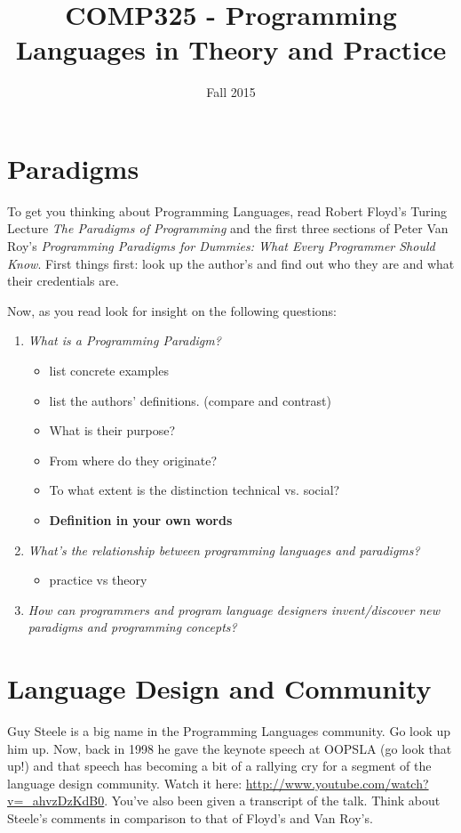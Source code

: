 \documentclass[10pt]{article}
\title{COMP325 - Programming Languages in Theory and Practice}
\author{  }
\date{Fall 2015}
\begin{document}
\maketitle

\section{Paradigms}

To get you thinking about Programming Languages, read Robert Floyd's Turing Lecture \textit{The Paradigms of Programming} and the first three sections of Peter Van Roy's \textit{Programming Paradigms for Dummies: What Every Programmer Should Know}.  First things first: look up the author's and find out who they are and what their credentials are.  

Now, as you read look for insight on the following questions:
\begin{enumerate}
\item \textit{What is a Programming Paradigm?}
\begin{itemize}
\item list concrete examples
\item list the authors' definitions. (compare and contrast)
\item What is their purpose? 
\item From where do they originate? 
\item To what extent is the distinction technical vs. social?
\item \textbf{Definition in your own words}
\end{itemize}
\item \textit{What's the relationship between programming languages and paradigms?}
\begin{itemize}
\item practice vs theory
\end{itemize}
\item \textit{How can programmers and program language designers invent/discover new paradigms and programming concepts?}
\end{enumerate}

\section{Language Design and Community}

Guy Steele is a big name in the Programming Languages community.  Go look up him up.  Now, back in 1998 he gave the keynote speech at OOPSLA (go look that up!) and that speech has becoming a bit of a rallying cry for a segment of the language design community.  Watch it here: \url{http://www.youtube.com/watch?v=_ahvzDzKdB0}. You've also been given a transcript of the talk. Think about Steele's comments in comparison to that of Floyd's and Van Roy's.
\end{document}
